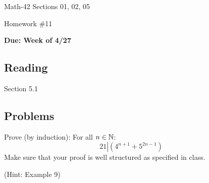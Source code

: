 \documentclass[letterpaper,12pt,fleqn]{article}
\begin{document}
\begin{center}
  \large
  Math-42 Sections 01, 02, 05

  \Large
  Homework \#11

  \large
  \textbf{Due: Week of 4/27}
\end{center}

\subsection*{Reading}

Section 5.1

\subsection*{Problems}

Prove (by induction): For all \(n\in\mathbb{N}\):
\[21\left|\left(4^{n+1}+5^{2n-1}\right)\right.\]
Make sure that your proof is well structured as specified in class.

(Hint: Example 9)
\end{document}
